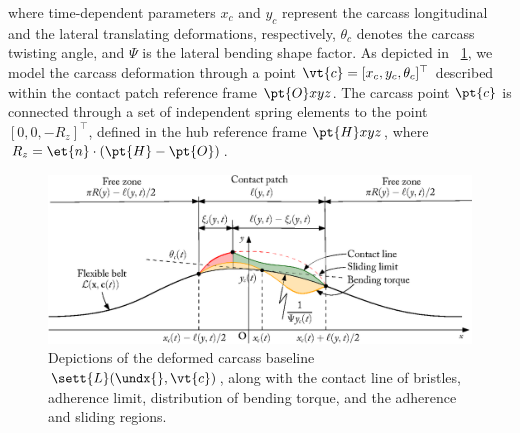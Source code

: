 %
where time-dependent parameters $x_c$ and $y_c$ represent the carcass longitudinal and the lateral translating deformations, respectively, $\theta_c$ denotes the carcass twisting angle, and $\Psi$ is the lateral bending shape factor. As depicted in \figurename~\ref{app3:fig:contact_patch}, we model the carcass deformation through a point $\vt{c} = [x_c, y_c, \theta_c]^\top$ described within the contact patch reference frame $\pt{O}xyz$. The carcass point $\pt{c}$ is connected through a set of independent spring elements to the point $\left[0, 0, -R_z\right]^\top$, defined in the hub reference frame $\pt{H}xyz$, where $R_z = \et{n} \cdot (\pt{H}-\pt{O})$.

\begin{figure}[htb]
  \centering
  \includegraphics[width=0.8\linewidth]{figures/appendix_3/contact_patch}
  \caption{Depictions of the deformed carcass baseline $\sett{L}(\undx{}, \vt{c})$, along with the contact line of bristles, adherence limit, distribution of bending torque, and the adherence and sliding regions.}
  \label{app3:fig:contact_patch}
\end{figure}

